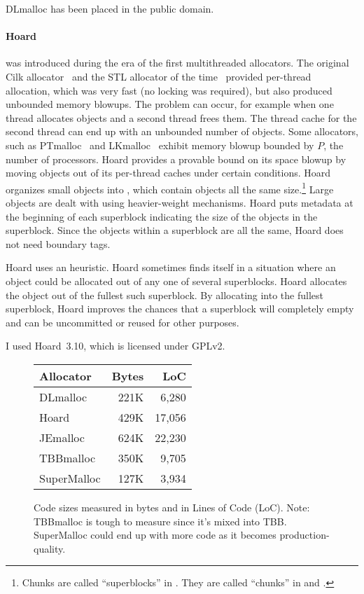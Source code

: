 \documentclass[natbib,sort&compress]{sigplanconf}
\begin{document}
DLmalloc has been placed in the public domain.

{\paragraph{Hoard}} \cite{BergerMcBl00} was introduced during the era
of the first multithreaded allocators.  The original Cilk
allocator~\cite{BlumofeLe94} and the STL allocator of the
time~\cite{SGI97} provided per-thread allocation, which was very fast
(no locking was required), but also produced unbounded memory blowups.
The problem can occur, for example when one thread allocates objects
and a second thread frees them.  The thread cache for the second
thread can end up with an unbounded number of objects.  Some
allocators, such as PTmalloc~\cite{Gloger06} and
LKmalloc~\cite{LarsonKr98} exhibit memory blowup bounded by $P$, the
number of processors.  Hoard provides a provable bound on its space
blowup by moving objects out of its per-thread caches under certain
conditions.  Hoard organizes small objects into , which
contain objects all the same size.\footnote{Chunks are called
  ``superblocks'' in \cite{BergerMcBl00}.  They are called ``chunks''
  in \cite{Evans06} and \cite{KukanovVo07}.}  Large objects are dealt
with using heavier-weight mechanisms.  Hoard puts metadata at the
beginning of each superblock indicating the size of the objects in the
superblock.  Since the objects within a superblock are all the same,
Hoard does not need boundary tags.

Hoard uses an  heuristic.  Hoard sometimes
finds itself in a situation where an object could be allocated out of
any one of several superblocks.  Hoard allocates the object out of the
fullest such superblock. By allocating into the fullest superblock,
Hoard improves the chances that a superblock will completely empty and
can be uncommitted or reused for other purposes.

I used Hoard~3.10, which is licensed under GPLv2.

\begin{figure}
\begin{center}
\begin{tabular}{lrr}
Allocator & Bytes        & LoC \\ \hline
 DLmalloc    \cite{Lea96}        & 221K &  6,280 \\
 Hoard       \cite{BergerMcBl00} & 429K & 17,056 \\
 JEmalloc    \cite{Evans06}      & 624K & 22,230 \\
 TBBmalloc   \cite{KukanovVo07}  & 350K &  9,705 \\
 SuperMalloc                     & 127K &  3,934 \\
\end{tabular}
\end{center}
\caption{Code sizes measured in bytes and in Lines of Code (LoC).
  Note: TBBmalloc is tough to measure since it's mixed into TBB.
  SuperMalloc could end up with more code as it becomes
  production-quality.}
\label{fig:codesize}
\end{figure}
\end{document}
